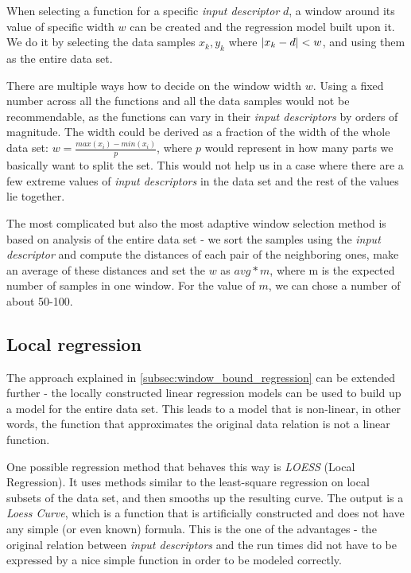 When selecting a function for a specific \textit{input descriptor} $d$, a window around its value of specific width $w$ can be created and the regression model built upon it. We do it by selecting the data samples $x_k, y_k$ where $\left|{x_k - d}\right| < w$, and using them as the entire data set.

There are multiple ways how to decide on the window width $w$. Using a fixed number across all the functions and all the data samples would not be recommendable, as the functions can vary in their \textit{input descriptors} by orders of magnitude. The width could be derived as a fraction of the width of the whole data set: $w = \frac{max(x_i) - min(x_i)}{p}$, where $p$ would represent in how many parts we basically want to split the set. This would not help us in a case where there are a few extreme values of \textit{input descriptors} in the data set and the rest of the values lie together. 

The most complicated but also the most adaptive window selection method is based on analysis of the entire data set - we sort the samples using the \textit{input descriptor} and compute the distances of each pair of the neighboring ones, make an average of these distances and set the $w$ as $avg * m$, where m is the expected number of samples in one window. For the value of $m$, we can chose a number of about 50-100.

\subsection{Local regression}

The approach explained in \ref{subsec:window_bound_regression} can be extended further - the locally constructed linear regression models can be used to build up a model for the entire data set. This leads to a model that is non-linear, in other words, the function that approximates the original data relation is not a linear function.

One possible regression method that behaves this way is \textit{LOESS} (Local Regression). It uses methods similar to the least-square regression on local subsets of the data set, and then smooths up the resulting curve. The output is a \textit{Loess Curve}, which is a function that is artificially constructed and does not have any simple (or even known) formula. This is the one of the advantages - the original relation between \textit{input descriptors} and the run times did not have to be expressed by a nice simple function in order to be modeled correctly.

